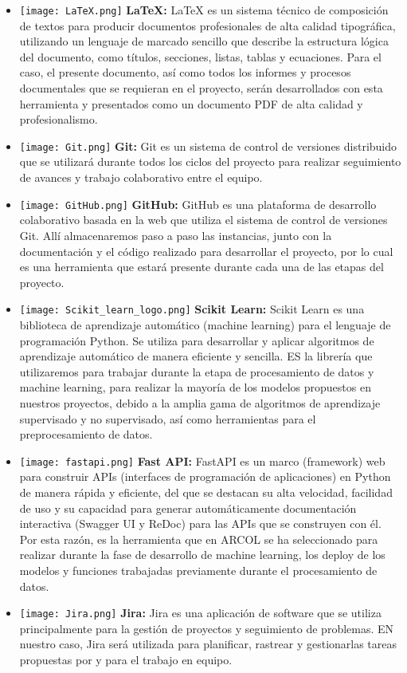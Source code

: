 \documentclass[12pt]{article}
\begin{document}
\begin{itemize}
    \item \texttt{[image: LaTeX.png]}
    \textbf{\LaTeX{}:} LaTeX es un sistema técnico de composición de textos  para producir documentos profesionales de alta calidad tipográfica, utilizando un lenguaje de marcado sencillo que describe la estructura lógica del documento, como títulos, secciones, listas, tablas y ecuaciones.
    Para el caso, el presente documento, así como todos los informes y procesos documentales que se requieran en el proyecto, serán desarrollados con esta herramienta y presentados como un documento PDF de alta calidad y profesionalismo. 

    \item \texttt{[image: Git.png]}
    \textbf{Git:} Git es un sistema de control de versiones distribuido que se utilizará durante todos los ciclos del proyecto para realizar seguimiento de avances y trabajo colaborativo entre el equipo.

    \item \texttt{[image: GitHub.png]}
    \textbf{GitHub:} GitHub es una plataforma de desarrollo colaborativo basada en la web que utiliza el sistema de control de versiones Git. Allí almacenaremos paso a paso las instancias, junto con la documentación y el código realizado para desarrollar el proyecto, por lo cual es una herramienta que estará presente durante cada una de las etapas del proyecto.

    \item \texttt{[image: Scikit\_learn\_logo.png]}
    \textbf{Scikit Learn:} Scikit Learn es una biblioteca de aprendizaje automático (machine learning) para el lenguaje de programación Python. Se utiliza para desarrollar y aplicar algoritmos de aprendizaje automático de manera eficiente y sencilla. ES la librería que utilizaremos para trabajar durante la etapa de procesamiento de datos y machine learning, para realizar la mayoría de los modelos propuestos en nuestros proyectos, debido a la amplia gama de algoritmos de aprendizaje supervisado y no supervisado, así como herramientas para el preprocesamiento de datos.

    \item \texttt{[image: fastapi.png]}
    \textbf{Fast API:} FastAPI es un marco (framework) web para construir APIs (interfaces de programación de aplicaciones) en Python de manera rápida y eficiente, del que se destacan su alta velocidad, facilidad de uso y su capacidad para generar automáticamente documentación interactiva (Swagger UI y ReDoc) para las APIs que se construyen con él. Por esta razón, es la herramienta que en ARCOL se ha seleccionado para realizar durante la fase de desarrollo de machine learning,  los deploy de los modelos y funciones trabajadas previamente durante el procesamiento de datos.

    \item \texttt{[image: Jira.png]}
    \textbf{Jira:} Jira es una aplicación de software que se utiliza principalmente para la gestión de proyectos y seguimiento de problemas. EN nuestro caso, Jira será utilizada para planificar, rastrear y gestionarlas tareas propuestas por y para el trabajo en equipo.
\end{itemize}    
\end{document}
